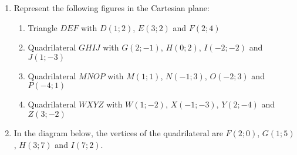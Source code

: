 \begin{eocexercises}{}
  \begin{enumerate}[noitemsep, label=\textbf{\arabic*}. ] 
  \item Represent the following figures in the Cartesian plane: 
    \begin{enumerate}[noitemsep, label=\textbf{(\alph*)} ]
    \item Triangle $DEF$ with $D(1;2)$, $E(3;2)$ and $F(2;4)$ 
    \item Quadrilateral $GHIJ$ with $G(2;-1)$, $H(0;2)$, $I(-2;-2)$ and $J(1;-3)$
    \item Quadrilateral $MNOP$ with $M(1;1)$, $N(-1;3)$, $O(-2;3)$ and $P(-4;1)$ 
    \item Quadrilateral $WXYZ$ with $W(1;-2)$, $X(-1;-3)$, $Y(2;-4)$ and $Z(3;-2)$
    \end{enumerate}
  \item In the diagram below, the vertices of the quadrilateral are $F(2;0)$, $G(1;5)$, $H(3;7)$ and $I(7;2)$.
    \setcounter{subfigure}{0}
    \begin{figure}[H] %
      \begin{center}
      \end{center}
    \end{figure}  


\end{enumerate}
\end{eocexercises}
